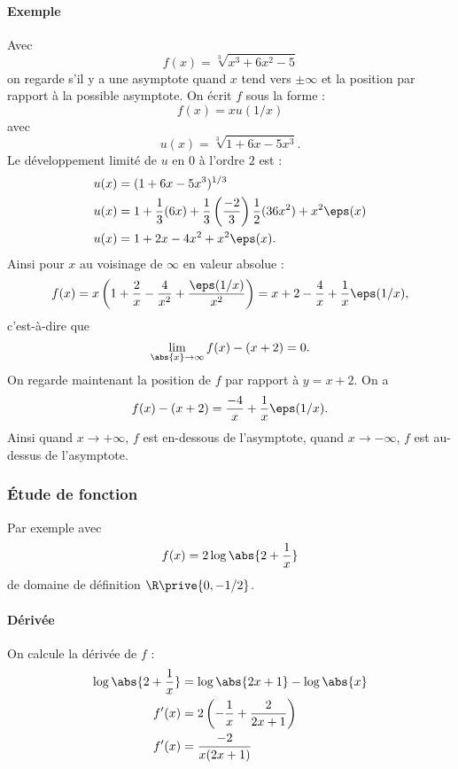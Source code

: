 \paragraph{Exemple}Avec \[ f(x) = \sqrt[3]{x^{3} + 6x^{2} - 5}\]on regarde s'il y a une asymptote quand $x$ tend vers $\pm \infty$ et la position par rapport à la possible asymptote. On écrit $f$ sous la forme : \[ f(x) = x u(1/x)\]avec \[ u(x) = \sqrt[3]{1 + 6x - 5x^{3}}.\]
Le développement limité de $u$ en $0$ à l'ordre $2$ est : 
\begin{align*}
u(x) &= (1+6x - 5x^{3})^{1/3} \\
u(x) &= 1 + \frac{1}{3}(6x) + \frac{1}{3}\left(\frac{-2}{3}\right)\frac{1}{2}(36x^{2}) + x^{2}\eps(x) \\
u(x) &= 1 + 2x - 4x^{2} + x^{2}\eps(x).
\end{align*}
Ainsi pour $x$ au voisinage de $\infty$ en valeur absolue : \[ f(x) = x\left(1+\frac{2}{x}-\frac{4}{x^{2}}+\frac{\eps(1/x)}{x^{2}} \right) = x+2 -\frac{4}{x} + \frac{1}{x}\eps(1/x),\]c'est-à-dire que \[ \lim_{\abs{x}\to\infty}f(x) - (x+2) = 0.\]
On regarde maintenant la position de $f$ par rapport à $y = x+2$. On a \[ f(x) - (x+2) = \frac{-4}{x} + \frac{1}{x}\eps(1/x).\]Ainsi quand $x\to+\infty$, $f$ est en-dessous de l'asymptote, quand $x\to -\infty$, $f$ est au-dessus de l'asymptote.

\subsubsection{\'Etude de fonction}Par exemple avec \[ f(x) = 2 \log\abs{2 + \frac{1}{x}}\]de domaine de définition $\R\prive{0,-1/2}$.

\paragraph{Dérivée}On calcule la dérivée de $f$ : 
\begin{align*}
\log\abs{2 + \frac{1}{x}} &= \log\abs{2x +1}- \log \abs{x} \\
f'(x) &= 2\left(-\frac{1}{x}+ \frac{2}{2x+1}\right)\\
f'(x) &= \frac{-2}{x(2x+1)}
\end{align*}


